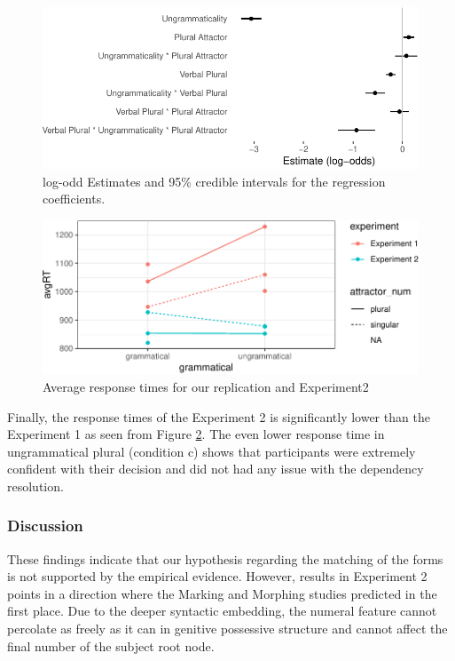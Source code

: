 \documentclass[doc]{apa6}
\begin{document}
\begin{figure}
\centering
\includegraphics{AgreementAttraction_files/figure-latex/exp2ResponseModelPlot-1.pdf}
\caption{\label{fig:exp2ResponseModelPlot}log-odd Estimates and 95\% credible intervals for the regression coefficients.}
\end{figure}

\begin{figure}
\centering
\includegraphics{AgreementAttraction_files/figure-latex/exp2AvgRTs-1.pdf}
\caption{\label{fig:exp2AvgRTs}Average response times for our replication and Experiment2}
\end{figure}

Finally, the response times of the Experiment 2 is significantly lower than the Experiment 1 as seen from Figure \ref{fig:exp2AvgRTs}. The even lower response time in ungrammatical plural (condition c) shows that participants were extremely confident with their decision and did not had any issue with the dependency resolution.

\hypertarget{discussion-1}{%
\subsubsection{Discussion}\label{discussion-1}}

These findings indicate that our hypothesis regarding the matching of the forms is not supported by the empirical evidence. However, results in Experiment 2 points in a direction where the Marking and Morphing studies predicted in the first place. Due to the deeper syntactic embedding, the numeral feature cannot percolate as freely as it can in genitive possessive structure and cannot affect the final number of the subject root node.
\end{document}
